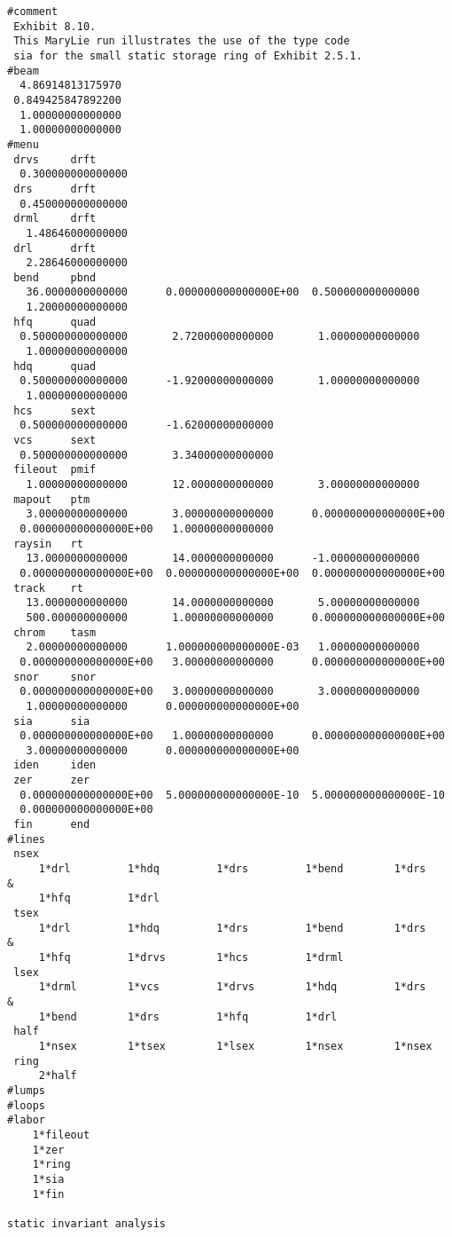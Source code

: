 \vspace{5mm}
\begin{footnotesize}
\begin{verbatim}
#comment
 Exhibit 8.10.
 This MaryLie run illustrates the use of the type code
 sia for the small static storage ring of Exhibit 2.5.1.
#beam
  4.86914813175970
 0.849425847892200
  1.00000000000000
  1.00000000000000
#menu
 drvs     drft
  0.300000000000000
 drs      drft
  0.450000000000000
 drml     drft
   1.48646000000000
 drl      drft
   2.28646000000000
 bend     pbnd
   36.0000000000000      0.000000000000000E+00  0.500000000000000
   1.20000000000000
 hfq      quad
  0.500000000000000       2.72000000000000       1.00000000000000
   1.00000000000000
 hdq      quad
  0.500000000000000      -1.92000000000000       1.00000000000000
   1.00000000000000
 hcs      sext
  0.500000000000000      -1.62000000000000
 vcs      sext
  0.500000000000000       3.34000000000000
 fileout  pmif
   1.00000000000000       12.0000000000000       3.00000000000000
 mapout   ptm
   3.00000000000000       3.00000000000000      0.000000000000000E+00
  0.000000000000000E+00   1.00000000000000
 raysin   rt
   13.0000000000000       14.0000000000000      -1.00000000000000
  0.000000000000000E+00  0.000000000000000E+00  0.000000000000000E+00
 track    rt
   13.0000000000000       14.0000000000000       5.00000000000000
   500.000000000000       1.00000000000000      0.000000000000000E+00
 chrom    tasm
   2.00000000000000      1.000000000000000E-03   1.00000000000000
  0.000000000000000E+00   3.00000000000000      0.000000000000000E+00
 snor     snor
  0.000000000000000E+00   3.00000000000000       3.00000000000000
   1.00000000000000      0.000000000000000E+00
 sia      sia
  0.000000000000000E+00   1.00000000000000      0.000000000000000E+00
   3.00000000000000      0.000000000000000E+00
 iden     iden
 zer      zer
  0.000000000000000E+00  5.000000000000000E-10  5.000000000000000E-10
  0.000000000000000E+00
 fin      end
#lines
 nsex
     1*drl         1*hdq         1*drs         1*bend        1*drs      &
     1*hfq         1*drl
 tsex
     1*drl         1*hdq         1*drs         1*bend        1*drs      &
     1*hfq         1*drvs        1*hcs         1*drml
 lsex
     1*drml        1*vcs         1*drvs        1*hdq         1*drs      &
     1*bend        1*drs         1*hfq         1*drl
 half
     1*nsex        1*tsex        1*lsex        1*nsex        1*nsex
 ring
     2*half
#lumps
#loops
#labor
    1*fileout
    1*zer
    1*ring
    1*sia
    1*fin

static invariant analysis


\end{verbatim}
\end{footnotesize}
